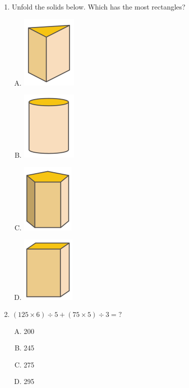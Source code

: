 \documentclass[12pt]{scrartcl}
\begin{document}
\begin{enumerate}
\item Unfold the solids below. Which has the most rectangles?
        \begin{multicols}{4}
        \begin{enumerate}[(A)]
            \item \includegraphics[scale=0.5]{StarGen/0Figure/wmi-2020-5a-4-a.png}
                    
            \item \includegraphics[scale=0.95]{StarGen/0Figure/wmi-2020-5a-4-b.png}
                    
            \item \includegraphics[scale=0.5]{StarGen/0Figure/wmi-2020-5a-4-c.png}
                    
            \item \includegraphics[scale=0.5]{StarGen/0Figure/wmi-2020-5a-4-d.png}  
        \end{enumerate}
        \end{multicols} \hrulefill
\hrulefill

\item $(125 \times 6) \div 5 + (75 \times 5) \div 3 = ?$
    \begin{multicols}{4}
        \begin{enumerate}[(A)]
            \item 200
            \item 245
            \item 275
            \item 295
        \end{enumerate}
    \end{multicols} \hrulefill


\end{enumerate}
\end{document}
